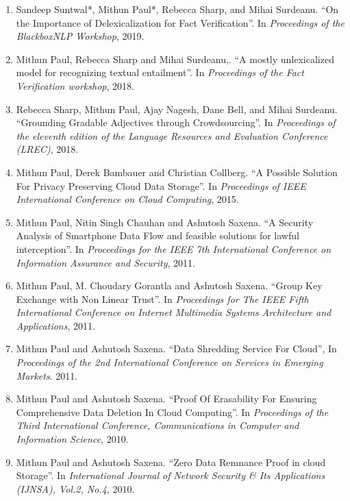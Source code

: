 \documentclass[10pt]{article}
\newcommand{\ve}[1]{{\em #1}} %
\newcommand{\ti}[1]{``#1''} %
\begin{document}
\begin{description}
\begin{enumerate}
\item Sandeep Suntwal*, Mithun Paul*, Rebecca Sharp, and Mihai Surdeanu.   \ti{On the Importance of Delexicalization for Fact Verification}. In \ve{Proceedings of the BlackboxNLP Workshop}, 2019.

\item Mithun Paul, Rebecca Sharp and Mihai Surdeanu,.   \ti{A mostly unlexicalized model for recognizing textual entailment}. In \ve{Proceedings of the Fact Verification workshop}, 2018.

\item Rebecca Sharp, Mithun Paul, Ajay Nagesh, Dane  Bell, and Mihai Surdeanu.   \ti{Grounding Gradable Adjectives through Crowdsourcing}. In \ve{Proceedings of the eleventh edition of the Language Resources and Evaluation Conference (LREC)}, 2018.

\item Mithun Paul, Derek Bambauer and Christian Collberg.   \ti{A Possible Solution For Privacy Preserving Cloud Data Storage}. In \ve{Proceedings of IEEE International Conference on Cloud Computing}, 2015.

\item  Mithun Paul, Nitin Singh Chauhan and Ashutosh Saxena.   \ti{A Security Analysis of Smartphone Data Flow and feasible solutions for lawful interception}. In \ve{ Proceedings for the IEEE 7th International Conference on Information Assurance and Security}, 2011.

\item  Mithun Paul, M. Choudary Gorantla and Ashutosh Saxena.   \ti{Group Key Exchange with Non Linear Trust}. In \ve{ Proceedings for The IEEE Fifth International Conference on Internet Multimedia Systems Architecture and Applications}, 2011.

\item  Mithun Paul and Ashutosh Saxena.   \ti{Data Shredding Service For Cloud}, In \ve{  Proceedings of the 2nd International Conference on Services in Emerging Markets}. 2011.

\item  Mithun Paul and Ashutosh Saxena.   \ti{Proof Of Erasability For Ensuring Comprehensive Data Deletion In Cloud Computing}. In \ve{  Proceedings of the Third International Conference, Communications in Computer and Information Science}, 2010.

\item  Mithun Paul and Ashutosh Saxena.   \ti{Zero Data Remnance Proof in cloud Storage}. In \ve{  International Journal of Network Security \& Its Applications (IJNSA), Vol.2, No.4}, 2010.





\end{enumerate}
\end{description}
\end{document}
